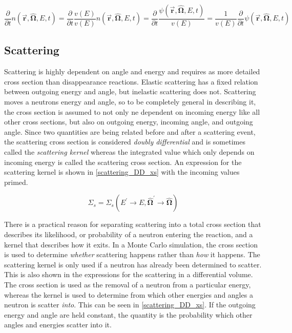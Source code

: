\begin{equation}
\label{time_depedent_flux}
\frac{\partial }{\partial t}n(\boldsymbol{\vec{r}},\boldsymbol{\hat{\Omega}},E,t) = \frac{\partial }{\partial t}  \frac{v(E)}{v(E)} n(\boldsymbol{\vec{r}},\boldsymbol{\hat{\Omega}},E,t) =  \frac{\partial }{\partial t}  \frac{\psi(\boldsymbol{\vec{r}},\boldsymbol{\hat{\Omega}},E,t)}{v(E)} = \frac{1}{v(E)} \frac{\partial }{\partial t}\psi(\boldsymbol{\vec{r}},\boldsymbol{\hat{\Omega}},E,t)
\end{equation}

\subsection{Scattering}

Scattering is highly dependent on angle and energy and requires as more detailed cross section than disappearance reactions.  Elastic scattering has a fixed relation between outgoing energy and angle, but inelastic scattering does not.  Scattering moves a neutrons energy and angle, so to be completely general in describing it, the cross section is assumed to not only ne dependent on incoming energy like all other cross sections, but also on outgoing energy, incoming angle, and outgoing angle.  Since two quantities are being related before and after a scattering event, the scattering cross section is considered \emph{doubly differential} and is sometimes called the \emph{scattering kernel} whereas the integrated value which only depends on incoming energy is called the scattering cross section.   An expression for the scattering kernel is shown in \eqref{scattering_DD_xs} with the incoming values primed.

\begin{equation}
\label{scattering_DD_xs}
\Sigma_s = \Sigma_s(E^\prime \rightarrow E,\boldsymbol{\hat{\Omega}}^\prime \rightarrow \boldsymbol{\hat{\Omega}})
 \end{equation}

There is a practical reason for separating scattering into a total cross section that describes its likelihood, or probability of a neutron entering the reaction, and a kernel that describes how it exits.  In a Monte Carlo simulation, the cross section is used to determine \emph{whether} scattering happens rather than \emph{how} it happens.  The scattering kernel is only used if a neutron has already been determined to scatter.  This is also shown in the expressions for the scattering in a differential volume.  The cross section is used as the removal of a neutron from a particular energy, whereas the kernel is used to determine from which other energies and angles a neutron is scatter \emph{into}.  This can be seen in \eqref{scattering_DD_xs}.  If the outgoing energy and angle are held constant, the quantity is the probability which other angles and energies scatter into it.

